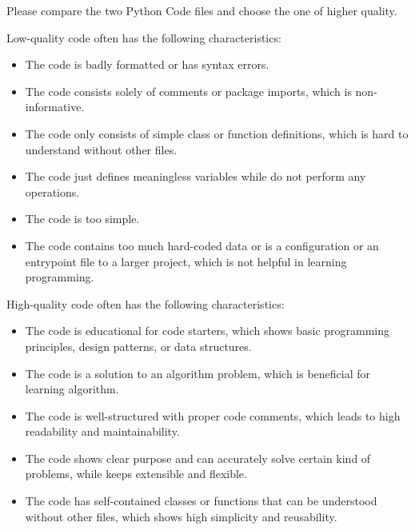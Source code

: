 Please compare the two Python Code files and choose the one of higher quality.

Low-quality code often has the following characteristics:

\begin{itemize}
    \item The code is badly formatted or has syntax errors.

    \item The code consists solely of comments or package imports, which is non-informative.

    \item The code only consists of simple class or function definitions, which
        is hard to understand without other files.

    \item The code just defines meaningless variables while do not perform any operations.

    \item The code is too simple.

    \item The code contains too much hard-coded data or is a configuration or an
        entrypoint file to a larger project, which is not helpful in learning
        programming.
\end{itemize}

High-quality code often has the following characteristics:

\begin{itemize}
    \item The code is educational for code starters, which shows basic
        programming principles, design patterns, or data structures.

    \item The code is a solution to an algorithm problem, which is beneficial
        for learning algorithm.

    \item The code is well-structured with proper code comments, which leads to
        high readability and maintainability.

    \item The code shows clear purpose and can accurately solve certain kind of problems,
        while keeps extensible and flexible.

    \item The code has self-contained classes or functions that can be understood
        without other files, which shows high simplicity and reusability.
\end{itemize}


